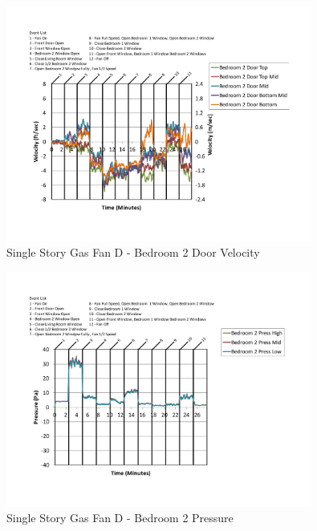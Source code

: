 \documentclass{article}
\begin{document}
\begin{appendices}
	\begin{figure}[H]
		\centering
		\includegraphics[height=3.05in,trim=0.67in 1.1in 0.67in 0.8in,clip=true]{0_Images/Results_Charts/ColdFlow/Single_Story/Gas/D/Bedroom_2_Door_Velocity.pdf}
		\caption{Single Story Gas Fan D - Bedroom 2 Door Velocity}
	\end{figure}
 

	\begin{figure}[H]
		\centering
		\includegraphics[height=3.05in,trim=0.67in 1.1in 0.67in 0.8in,clip=true]{0_Images/Results_Charts/ColdFlow/Single_Story/Gas/D/Bedroom_2_Pressure.pdf}
		\caption{Single Story Gas Fan D - Bedroom 2 Pressure}
	\end{figure}
 
	\clearpage


\end{appendices}
\end{document}
